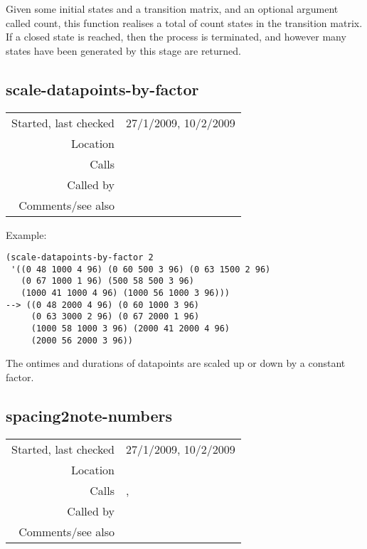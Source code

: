 \noindent Given some initial states and a transition
matrix, and an optional argument called count, this
function realises a total of count states in the
transition matrix. If a closed state is reached, then
the process is terminated, and however many states
have been generated by this stage are returned.


\subsection*{scale-datapoints-by-factor}\label{fun:scale-datapoints-by-factor}

\vspace{0.3cm}
\begin{tabular}{r|p{8cm}}
Started, last checked & 27/1/2009, 10/2/2009 \\
Location & \nameref{sec:markov-compose} \\
Calls & \nameref{fun:choose-one} \\
Called by & \\
Comments/see also &
\end{tabular}

\vspace{0.5cm}
\noindent Example:
\begin{verbatim}
(scale-datapoints-by-factor 2
 '((0 48 1000 4 96) (0 60 500 3 96) (0 63 1500 2 96)
   (0 67 1000 1 96) (500 58 500 3 96)
   (1000 41 1000 4 96) (1000 56 1000 3 96)))
--> ((0 48 2000 4 96) (0 60 1000 3 96)
     (0 63 3000 2 96) (0 67 2000 1 96)
     (1000 58 1000 3 96) (2000 41 2000 4 96)
     (2000 56 2000 3 96))
\end{verbatim}

\noindent The ontimes and durations of datapoints are
scaled up or down by a constant factor.


\subsection*{spacing2note-numbers}\label{fun:spacing2note-numbers}

\vspace{0.3cm}
\begin{tabular}{r|p{8cm}}
Started, last checked & 27/1/2009, 10/2/2009 \\
Location & \nameref{sec:markov-compose} \\
Calls & \nameref{fun:add-to-list}, \nameref{fun:fibonacci-list} \\
Called by & \nameref{fun:create-MIDI-note-numbers} \\
Comments/see also &
\end{tabular}

